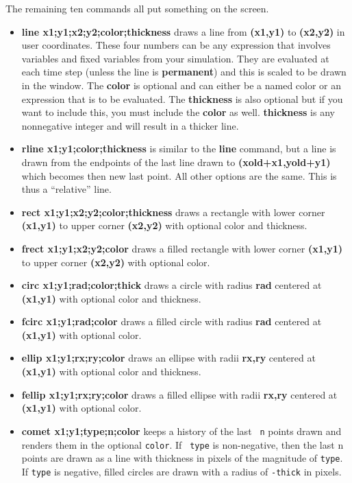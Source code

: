 \documentclass{article}
\begin{document}
The remaining ten commands all put something on the screen.
\begin{itemize}

\item {\bf line x1;y1;x2;y2;color;thickness }  draws a line from {\bf (x1,y1)}
to {\bf (x2,y2)} in user coordinates.  These four numbers can be any
expression that involves variables and fixed variables from your
simulation. They are evaluated at each time step (unless the line is
{\bf permanent}) and this is scaled to be drawn in the window.  The
{\bf color} is optional and can either be a named color or an
expression that is to be evaluated. The {\bf thickness} is also
optional but if you want to include this, you must include the {\bf
color} as well. {\bf thickness} is any nonnegative integer and will
result in a thicker line.

\item {\bf rline x1;y1;color;thickness } is similar to the {\bf line}
command, but a line is drawn from the endpoints of the last line drawn
to {\bf (xold+x1,yold+y1)} which becomes then new last point. All other options
are the same. This is thus a ``relative'' line.

\item {\bf rect x1;y1;x2;y2;color;thickness } draws a rectangle with
lower corner {\bf (x1,y1)} to upper corner {\bf (x2,y2)} with optional
color and thickness.

\item {\bf frect x1;y1;x2;y2;color } draws a filled rectangle with
lower corner {\bf (x1,y1)} to upper corner {\bf (x2,y2)} with optional
color.

\item {\bf circ x1;y1;rad;color;thick } draws a circle with radius {\bf rad}
centered at {\bf (x1,y1)} with optional
color and thickness.

\item {\bf fcirc x1;y1;rad;color } draws a filled circle with radius {\bf rad}
centered at {\bf (x1,y1)} with optional color.

\item {\bf ellip x1;y1;rx;ry;color } draws an ellipse with radii {\bf rx,ry}
centered at {\bf (x1,y1)} with optional
color and thickness.

\item {\bf fellip x1;y1;rx;ry;color } draws a filled ellipse with
radii {\bf rx,ry}  centered at {\bf (x1,y1)} with optional
color.

\item {\bf comet x1;y1;type;n;color} keeps a history of the last {\tt
n} points drawn and renders them in the optional {\tt color}. If {\tt
type} is non-negative, then the last n points are drawn as a line with
thickness in pixels of the magnitude of {\tt type}.  If {\tt type} is
negative, filled circles are drawn with a radius of {\tt -thick} in
pixels.


\end{itemize}
\end{document}
